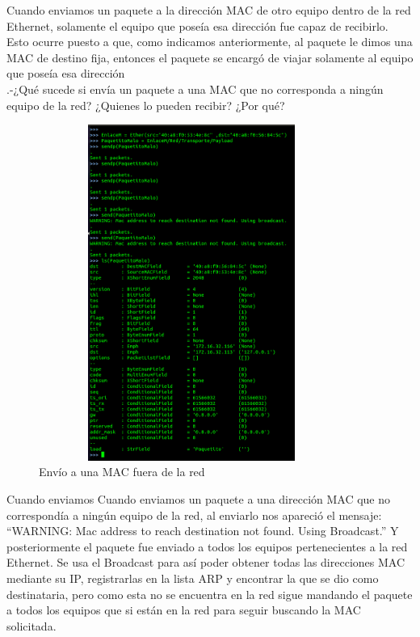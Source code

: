 \documentclass{udpreport}
\begin{document}
 	      Cuando enviamos un paquete a la dirección MAC de otro equipo dentro de la red Ethernet, solamente el equipo que poseía
 	      esa dirección fue capaz de recibirlo. Esto ocurre puesto a que, como indicamos anteriormente, al paquete le dimos una
 	      MAC de destino fija, entonces el paquete se encargó de viajar solamente al equipo que poseía esa dirección\\
        .-¿Qué sucede si envía un paquete a una MAC que no corresponda a ningún equipo
  	      de la red? ¿Quienes lo pueden recibir? ¿Por qué?\\
    		\begin{figure}[H]
  	        	\centering
  	          	\includegraphics[width=10cm,height=11cm]{EnvioPaquetitoMalo.png}
  	        	\caption{Envío a una MAC fuera de la red}
  	        \end{figure}
 	      Cuando enviamos 
 	      Cuando enviamos un paquete a una dirección MAC que no correspondía a ningún equipo de la red, al enviarlo nos apareció
 	      el mensaje: “WARNING: Mac address to reach destination not found. Using Broadcast.” Y posteriormente el paquete fue
 	      enviado a todos los equipos pertenecientes a la red Ethernet. Se usa el Broadcast para así poder obtener todas las
 	      direcciones MAC mediante su IP, registrarlas en la lista ARP y encontrar la que se dio como destinataria, pero como esta
 	      no se encuentra en la red sigue mandando el paquete a todos los equipos que si están en la red para seguir buscando la
 	      MAC solicitada.\\
\end{document}
